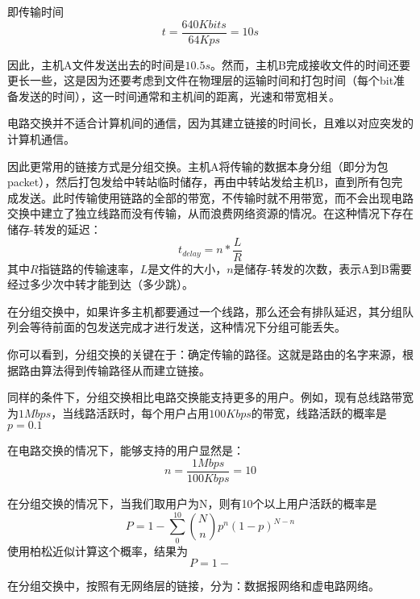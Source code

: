 \documentclass[fontset=windows]{article}
\begin{document}
	即传输时间
	\begin{equation}
		t = \frac{640Kbits}{64Kps}  = 10s 
	\end{equation}

	因此，主机A文件发送出去的时间是$10.5s$。然而，主机B完成接收文件的时间还要更长一些，这是因为还要考虑到文件在物理层的运输时间和打包时间（每个bit准备发送的时间），这一时间通常和主机间的距离，光速和带宽相关。

	电路交换并不适合计算机间的通信，因为其建立链接的时间长，且难以对应突发的计算机通信。

	因此更常用的链接方式是分组交换。主机A将传输的数据本身分组（即分为包packet），然后打包发给中转站临时储存，再由中转站发给主机B，直到所有包完成发送。此时传输使用链路的全部的带宽，不传输时就不用带宽，而不会出现电路交换中建立了独立线路而没有传输，从而浪费网络资源的情况。在这种情况下存在储存-转发的延迟：
	\begin{equation}
		t_{delay} = n*\frac{L}{R}
	\end{equation}
	其中$R$指链路的传输速率，$L$是文件的大小，$n$是储存-转发的次数，表示A到B需要经过多少次中转才能到达（多少跳）。

	在分组交换中，如果许多主机都要通过一个线路，那么还会有排队延迟，其分组队列会等待前面的包发送完成才进行发送，这种情况下分组可能丢失。

	你可以看到，分组交换的关键在于：确定传输的路径。这就是路由的名字来源，根据路由算法得到传输路径从而建立链接。
	
	同样的条件下，分组交换相比电路交换能支持更多的用户。例如，现有总线路带宽为$1Mbps$，当线路活跃时，每个用户占用$100Kbps$的带宽，线路活跃的概率是$p = 0.1$

	在电路交换的情况下，能够支持的用户显然是：
	\begin{equation}
		n = \frac{1Mbps}{100Kbps} = 10
	\end{equation}
	
	在分组交换的情况下，当我们取用户为N，则有10个以上用户活跃的概率是
	\begin{equation}
		P = 1 - \sum_{0}^{10}\binom{N}{n}p^n(1-p)^{N-n}
	\end{equation}
	使用柏松近似计算这个概率，结果为
	\begin{equation}
		P = 1 - 
	\end{equation}

	在分组交换中，按照有无网络层的链接，分为：数据报网络和虚电路网络。
\end{document}
